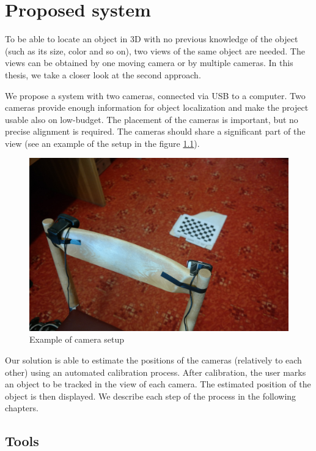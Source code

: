 \chapter{Proposed system}

To be able to locate an object in 3D with no previous knowledge of the object (such
as its size, color and so on), two views of the same object are needed. The
views can be obtained by one moving camera or by multiple cameras. In this
thesis, we take a closer look at the second approach.

We propose a system with two cameras, connected via USB to a computer.
Two cameras provide enough information for object localization and make the
project usable also on low-budget. The placement of the cameras is important,
but no precise alignment is required. The cameras should share a significant part
of the view (see an example of the setup in the figure \ref{fig:camera-setup}).

\begin{figure}
	\includegraphics[width=\linewidth]{img/camera-positions.jpg}
	\caption{Example of camera setup}
	\label{fig:camera-setup}
\end{figure}

Our solution is able to estimate the positions of the cameras (relatively to
each other) using an automated calibration process. After calibration, the user
marks an object to be tracked in the view of each camera. The estimated
position of the object is then displayed. We describe each step
of the process in the following chapters.

\section{Tools}

